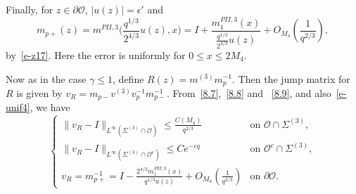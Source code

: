 \documentclass{amsart}
\theoremstyle{definition}
\theoremstyle{remark}
\numberwithin{equation}{section}
\begin{document}
Finally, for $z\in\partial\mathcal{O}$, 
$|u(z)|=\epsilon'$ and 
\begin{equation}\label{8.9}
   m_{p+}(z)=m^{PII,3}\bigl(\frac{q^{1/3}}{2^{4/3}}u(z),x\bigr)
=I+\frac{m^{PII,3}_1(x)}{\frac{q^{1/3}}{2^{4/3}}u(z)}+ 
O_{M_4}(\frac1{q^{2/3}}),
\end{equation}
by~\eqref{e-z17}.
Here the error is uniformly for $0\le x\le 2M_4$.

Now as in the case $\gamma\le 1$, 
define $R(z)=m^{(3)}m_p^{-1}$. Then the jump matrix for $R$ is given by 
$v_R=m_{p-}v^{(3)}v_p^{-1}m_{p-}^{-1}$. From~\eqref{8.7},~\eqref{8.8} and ~\eqref{8.9}, 
and also~\eqref{e-unif4}, 
we have 
\begin{equation}
  \begin{cases}
    \|v_R-I\|_{L^{\infty}(\Sigma^{(3)}\cap\mathcal{O})} 
\le\frac{C(M_4)}{q^{2/3}}& \text{on $\mathcal{O} \cap \Sigma^{(3)}$},\\
    \|v_R-I\|_{L^{\infty}(\Sigma^{(3)}\cap\mathcal{O}^c)}
\le Ce^{-cq}& \text{on $\mathcal{O}^c \cap \Sigma^{(3)}$},\\
    v_R=m_{p+}^{-1}=I-\frac{2^{4/3}m^{PII,3}_1(x)}{q^{1/3}u(z)}
+O_{M_4}(\frac{1}{q^{2/3}})& 
\text{on $\partial \mathcal{O}$}.
  \end{cases}
\end{equation}
\end{document}
